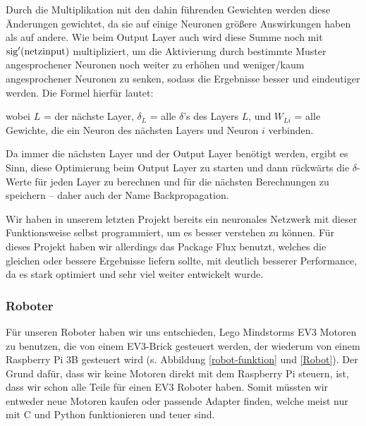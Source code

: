 \documentclass[11pt]{scrartcl}
\begin{document}
	Durch die Multiplikation mit den dahin führenden Gewichten werden diese Änderungen gewichtet, da sie auf einige Neuronen größere Auswirkungen haben als auf andere. Wie beim Output Layer auch wird diese Summe noch mit $\textrm{sig}'(\textrm{netzinput})$ multipliziert, um die Aktivierung durch bestimmte Muster angesprochener Neuronen noch weiter zu erhöhen und weniger/kaum angesprochener Neuronen zu senken, sodass die Ergebnisse besser und eindeutiger werden. Die Formel hierfür lautet:


	\noindent wobei $L$ = der nächste Layer, $\delta_L$ = alle $\delta$'s des Layers $L$, und $W_{Li}$ = alle Gewichte, die ein Neuron des nächsten Layers und Neuron $i$ verbinden.


	Da immer die nächsten Layer und der Output Layer benötigt werden, ergibt es Sinn, diese Optimierung beim Output Layer zu starten und dann rückwärts die \mbox{$\delta$-Werte} für jeden Layer zu berechnen und für die nächsten Berechnungen zu speichern -- daher auch der Name Backpropagation. \cite{MITNeuronale} \cite{3b1b:nn} \cite{brotcrunsher:backwardpass}


	Wir haben in unserem letzten Projekt bereits ein neuronales Netzwerk mit dieser Funktionsweise selbst programmiert, um es besser verstehen zu können. \cite{AIComposer} Für dieses Projekt haben wir allerdings das Package Flux benutzt, welches die gleichen oder bessere Ergebnisse liefern sollte, mit deutlich besserer Performance, da es stark optimiert und sehr viel weiter entwickelt wurde. \cite{Flux.jl-2018}

	\subsubsection{Roboter}

	Für unseren Roboter haben wir uns entschieden, Lego Mindstorms EV3 Motoren zu benutzen, die von einem EV3-Brick gesteuert werden, der wiederum von einem Raspberry Pi 3B gesteuert wird (s. Abbildung \ref{robot-funktion} und \ref{Robot}). Der Grund dafür, dass wir keine Motoren direkt mit dem Raspberry Pi steuern, ist, dass wir schon alle Teile für einen EV3 Roboter haben. Somit müssten wir entweder neue Motoren kaufen oder passende Adapter finden, welche meist nur mit C und Python funktionieren und teuer sind.
\end{document}
